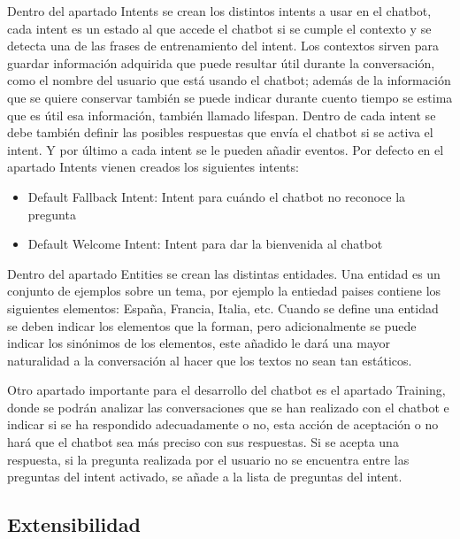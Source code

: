 Dentro del apartado Intents se crean los distintos intents a usar en el chatbot, cada intent es un estado al que accede el chatbot si se cumple el contexto y se detecta una de las frases de entrenamiento del intent. Los contextos sirven para guardar información adquirida que puede resultar útil durante la conversación, como el nombre del usuario que está usando el chatbot; además de la información que se quiere conservar también se puede indicar durante cuento tiempo se estima que es útil esa información, también llamado lifespan. Dentro de cada intent se debe también definir las posibles respuestas que envía el chatbot si se activa el intent. Y por último a cada intent se le pueden añadir eventos. Por defecto en el apartado Intents vienen creados los siguientes intents:

\begin{itemize}
    \item Default Fallback Intent: Intent para cuándo el chatbot no reconoce la pregunta
    \item Default Welcome Intent: Intent para dar la bienvenida al chatbot
\end{itemize}

Dentro del apartado Entities se crean las distintas entidades. Una entidad es un conjunto de ejemplos sobre un tema, por ejemplo la entiedad paises contiene los siguientes elementos: España, Francia, Italia, etc. Cuando se define una entidad se deben indicar los elementos que la forman, pero adicionalmente se puede indicar los sinónimos de los elementos, este añadido le dará una mayor naturalidad a la conversación al hacer que los textos no sean tan estáticos.

Otro apartado importante para el desarrollo del chatbot es el apartado Training, donde se podrán analizar las conversaciones que se han realizado con el chatbot e indicar si se ha respondido adecuadamente o no, esta acción de aceptación o no hará que el chatbot sea más preciso con sus respuestas. Si se acepta una respuesta, si la pregunta realizada por el usuario no se encuentra entre las preguntas del intent activado, se añade a la lista de preguntas del intent.

\subsection*{Extensibilidad}

